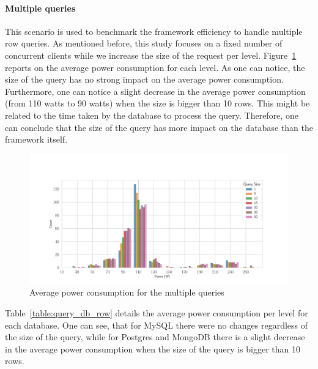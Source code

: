 \paragraph{Multiple queries}
This scenario is used to benchmark the framework efficiency to handle multiple row queries.
As mentioned before, this study focuses on a fixed number of concurrent clients while we increase the size of the request per level.
Figure~\ref{fig:av_power_query} reports on the average power consumption for each level.
As one can notice, the size of the query has no strong impact on the average power consumption.
Furthermore, one can notice a slight decrease in the average power consumption (from 110 watts to 90 watts) when the size is bigger than 10 rows.
This might be related to the time taken by the database to process the query.
Therefore, one can conclude that the size of the query has more impact on the database than the framework itself.

\begin{figure}[hbt]
    \centering
    \includegraphics[width=\textwidth,height=\textheight,keepaspectratio]{imgs/histogram_av_power_cpu_query}
    \caption{Average power consumption for the multiple queries }
    \label{fig:av_power_query}
\end{figure}

Table~\ref{table:query_db_row} details the average power consumption per level for each database.
One can see, that for MySQL there were no changes regardless of the size of the query, while for Postgres and MongoDB there is a slight decrease in the average power consumption when the size of the query is bigger than 10 rows.

